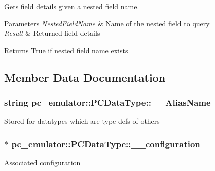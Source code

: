 Gets field details given a nested field name. 


\begin{DoxyParams}{Parameters}
{\em Nested\+Field\+Name} & Name of the nested field to query \\
\hline
{\em Result} & Returned field details \\
\hline
\end{DoxyParams}
\begin{DoxyReturn}{Returns}
True if nested field name exists 
\end{DoxyReturn}


\subsection{Member Data Documentation}
\subsubsection[{\texorpdfstring{\+\_\+\+\_\+\+Alias\+Name}{__AliasName}}]{\setlength{\rightskip}{0pt plus 5cm}string pc\+\_\+emulator\+::\+P\+C\+Data\+Type\+::\+\_\+\+\_\+\+Alias\+Name}\hypertarget{classpc__emulator_1_1PCDataType_a1d2bc1d0a8d4e10187329ec3aa9ecdce}{}\label{classpc__emulator_1_1PCDataType_a1d2bc1d0a8d4e10187329ec3aa9ecdce}
Stored for datatypes which are type defs of others 
\subsubsection[{\texorpdfstring{\+\_\+\+\_\+configuration}{__configuration}}]{$\ast$ pc\+\_\+emulator\+::\+P\+C\+Data\+Type\+::\+\_\+\+\_\+configuration}\hypertarget{classpc__emulator_1_1PCDataType_ae1d09cd2a600dea4b584dd428140df49}{}\label{classpc__emulator_1_1PCDataType_ae1d09cd2a600dea4b584dd428140df49}
Associated configuration 
